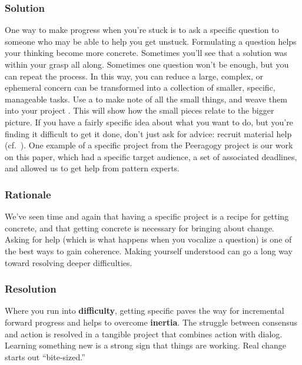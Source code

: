 \subsubsection*{Solution} 
One way to make progress when you're stuck is to ask a specific question to someone who may be able to help you get unstuck.   Formulating a question helps your thinking become more concrete.  Sometimes you'll see that a solution was within your grasp all along.  Sometimes one question won't be enough, but you can repeat the process. In this way, you can reduce a large, complex, or ephemeral concern can be transformed into a collection of smaller, specific, manageable tasks.  Use a  to make note of all the small things, and weave them into your project .  This will show how the small pieces relate to the bigger picture. If you have a fairly specific idea about what you want to do, but you're finding it difficult to get it done, don't just ask for advice: recruit material help (cf.~). One example of a specific project from the Peeragogy project is our work on this paper, which had a specific target audience, a set of associated deadlines, and allowed us to get help from pattern experts. 

\subsubsection*{Rationale} 
We've seen time and again that having a specific project is a recipe for getting concrete, and that getting concrete is necessary for bringing about change. Asking for help (which is what happens when you vocalize a question) is one of the best ways to gain coherence. Making yourself understood can go a long way toward resolving deeper difficulties.

\subsubsection*{Resolution}
Where you run into \textbf{difficulty}, getting specific paves the way for incremental forward progress and helps to overcome \textbf{inertia}. The struggle between consensus and action is resolved in a tangible project that combines action with dialog. Learning something new is a strong sign that things are working.
Real change starts out ``bite-sized.'' 


